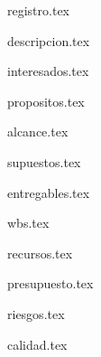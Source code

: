 \documentclass[12pt]{proyecto}
\begin{document}
\maketitle
\thispagestyle{empty}
\pagebreak


\thispagestyle{empty}
{\setlength{\parskip}{0pt}
\tableofcontents{}
}
\pagebreak


{registro.tex}


{descripcion.tex} %

{interesados.tex} %

{propositos.tex}

{alcance.tex} %

{supuestos.tex}



{entregables.tex} %

{wbs.tex} %

{recursos.tex}

{presupuesto.tex}
 

{riesgos.tex} %

{calidad.tex} %




\end{document}
